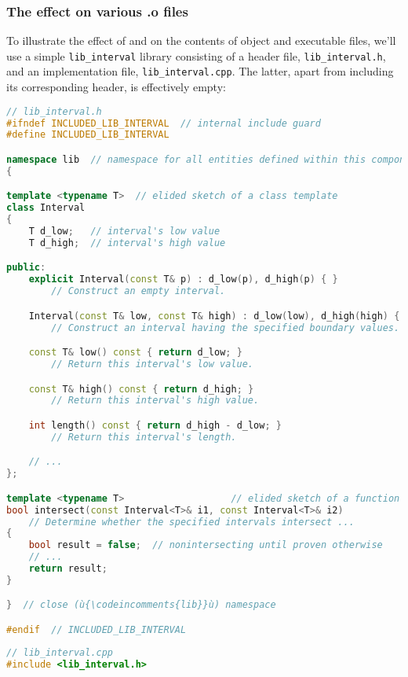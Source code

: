 \subsubsection[The effect on various \lstinline!.o! files]{The effect on various {\SubsubsecCode .o} files}\label{the-effect-on-various-.o-files}

To illustrate the effect of  and  on the contents of object and executable files,
we'll use a simple \lstinline!lib_interval! library 
consisting of a header file, \lstinline!lib_interval.h!, and an
implementation file, \lstinline!lib_interval.cpp!. The latter, apart from
including its corresponding header, is effectively empty:

\begin{lstlisting}[language=C++]
// lib_interval.h
#ifndef INCLUDED_LIB_INTERVAL  // internal include guard
#define INCLUDED_LIB_INTERVAL

namespace lib  // namespace for all entities defined within this component
{

template <typename T>  // elided sketch of a class template
class Interval
{
    T d_low;   // interval's low value
    T d_high;  // interval's high value

public:
    explicit Interval(const T& p) : d_low(p), d_high(p) { }
        // Construct an empty interval.

    Interval(const T& low, const T& high) : d_low(low), d_high(high) { }
        // Construct an interval having the specified boundary values.

    const T& low() const { return d_low; }
        // Return this interval's low value.

    const T& high() const { return d_high; }
        // Return this interval's high value.

    int length() const { return d_high - d_low; }
        // Return this interval's length.

    // ...
};

template <typename T>                   // elided sketch of a function template
bool intersect(const Interval<T>& i1, const Interval<T>& i2)
    // Determine whether the specified intervals intersect ...
{
    bool result = false;  // nonintersecting until proven otherwise
    // ...
    return result;
}

}  // close (ù{\codeincomments{lib}}ù) namespace

#endif  // INCLUDED_LIB_INTERVAL
\end{lstlisting}
\vspace*{2ex}   %
\begin{lstlisting}[language=C++]
// lib_interval.cpp
#include <lib_interval.h>
\end{lstlisting}
    

